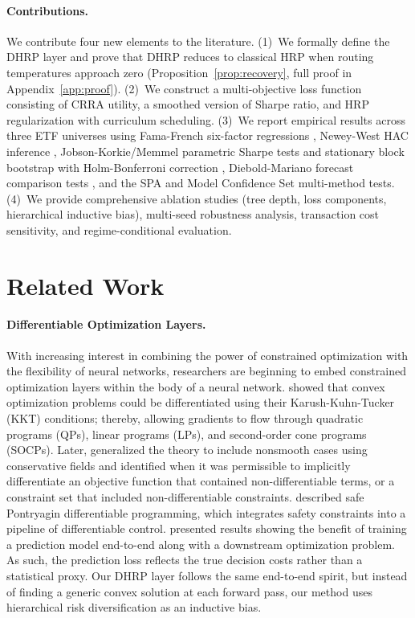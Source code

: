 \documentclass{article}
\begin{document}
\paragraph{Contributions.} We contribute four new elements to the literature. (1)~We formally define the DHRP layer and prove that DHRP reduces to classical HRP when routing temperatures approach zero (Proposition~\ref{prop:recovery}, full proof in Appendix~\ref{app:proof}). (2)~We construct a multi-objective loss function consisting of CRRA utility, a smoothed version of Sharpe ratio, and HRP regularization with curriculum scheduling. (3)~We report empirical results across three ETF universes using Fama-French six-factor regressions \citep{Carhart1997, FamaFrench2015}, Newey-West HAC inference \citep{NeweyWest1987}, Jobson-Korkie/Memmel parametric Sharpe tests \citep{JobsonKorkie1981, Memmel2003} and stationary block bootstrap \citep{PolitisRomano1994} with Holm-Bonferroni correction \citep{Holm1979}, Diebold-Mariano forecast comparison tests \citep{DieboldMariano1995}, and the SPA \citep{Hansen2005} and Model Confidence Set \citep{HansenLundeNason2011} multi-method tests. (4)~We provide comprehensive ablation studies (tree depth, loss components, hierarchical inductive bias), multi-seed robustness analysis, transaction cost sensitivity, and regime-conditional evaluation.

\section{Related Work}

\paragraph{Differentiable Optimization Layers.} With increasing interest in combining the power of constrained optimization with the flexibility of neural networks, researchers are beginning to embed constrained optimization layers within the body of a neural network. \citet{Agrawal2019} showed that convex optimization problems could be differentiated using their Karush-Kuhn-Tucker (KKT) conditions; thereby, allowing gradients to flow through quadratic programs (QPs), linear programs (LPs), and second-order cone programs (SOCPs). Later, \citet{Bolte2021} generalized the theory to include nonsmooth cases using conservative fields and identified when it was permissible to implicitly differentiate an objective function that contained non-differentiable terms, or a constraint set that included non-differentiable constraints. \citet{Jin2021} described safe Pontryagin differentiable programming, which integrates safety constraints into a pipeline of differentiable control. \citet{Donti2017} presented results showing the benefit of training a prediction model end-to-end along with a downstream optimization problem. As such, the prediction loss reflects the true decision costs rather than a statistical proxy. Our DHRP layer follows the same end-to-end spirit, but instead of finding a generic convex solution at each forward pass, our method uses hierarchical risk diversification as an inductive bias.
\end{document}
